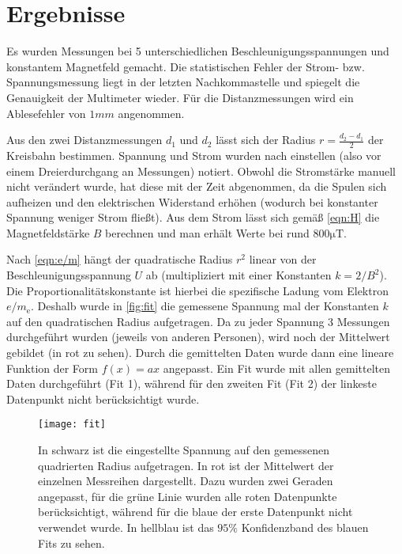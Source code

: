\section{Ergebnisse}
Es wurden Messungen bei 5 unterschiedlichen Beschleunigungsspannungen und konstantem Magnetfeld gemacht. Die statistischen Fehler der Strom- bzw. Spannungsmessung liegt in der letzten Nachkommastelle und spiegelt die Genauigkeit der Multimeter wieder. Für die Distanzmessungen wird ein Ablesefehler von \( 1 \unit{mm} \) angenommen. 

Aus den zwei Distanzmessungen \( d_1 \) und \( d_2 \) lässt sich der Radius \( r = \tfrac{d_2 - d_1}{2} \) der Kreisbahn bestimmen. Spannung und Strom wurden nach einstellen (also vor einem Dreierdurchgang an Messungen) notiert. Obwohl die Stromstärke manuell nicht verändert wurde, hat diese mit der Zeit abgenommen, da die Spulen sich aufheizen und den elektrischen Widerstand erhöhen (wodurch bei konstanter Spannung weniger Strom fließt). Aus dem Strom lässt sich gemäß \autoref{eqn:H} die Magnetfeldstärke \( B \) berechnen und man erhält Werte bei rund \( 800 \unit{\micro\tesla} \). 

Nach \autoref{eqn:e/m} hängt der quadratische Radius \( r^2 \) linear von der Beschleunigungsspannung \( U \) ab (multipliziert mit einer Konstanten \( k = 2/B^2 \)). Die Proportionalitätskonstante ist hierbei die spezifische Ladung vom Elektron \( e/m_{\text{e}} \). Deshalb wurde in \autoref{fig:fit} die gemessene Spannung mal der Konstanten \( k \) auf den quadratischen Radius aufgetragen. Da zu jeder Spannung 3 Messungen durchgeführt wurden (jeweils von anderen Personen), wird noch der Mittelwert gebildet (in rot zu sehen). Durch die gemittelten Daten wurde dann eine lineare Funktion der Form \( f(x) = ax \) angepasst. Ein Fit wurde mit allen gemittelten Daten durchgeführt (Fit 1), während für den zweiten Fit (Fit 2) der linkeste Datenpunkt nicht berücksichtigt wurde. 

\begin{figure}[H]	
	\centering
	\texttt{[image: fit]}
	\caption{In schwarz ist die eingestellte Spannung auf den gemessenen quadrierten Radius aufgetragen. In rot ist der Mittelwert der einzelnen Messreihen dargestellt. Dazu wurden zwei Geraden angepasst, für die grüne Linie wurden alle roten Datenpunkte berücksichtigt, während für die blaue der erste Datenpunkt nicht verwendet wurde. In hellblau ist das \( 95 \% \) Konfidenzband des blauen Fits zu sehen.}
	\label{fig:fit}
\end{figure}

